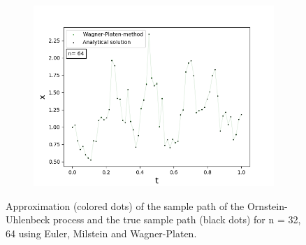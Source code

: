\begin{figure}[!h]
\begin{subfigure}{0.49\linewidth}
   \end{subfigure}
   \begin{subfigure}{0.49\linewidth} \centering
     \includegraphics[scale=0.4]{Content/Graphics/Appendix/6gbm3}
   \end{subfigure}
\caption{Approximation (colored dots) of the sample path of the Ornstein-Uhlenbeck process and the true sample path (black dots) for n = 32, 64 using Euler, Milstein and Wagner-Platen.}
\end{figure}


